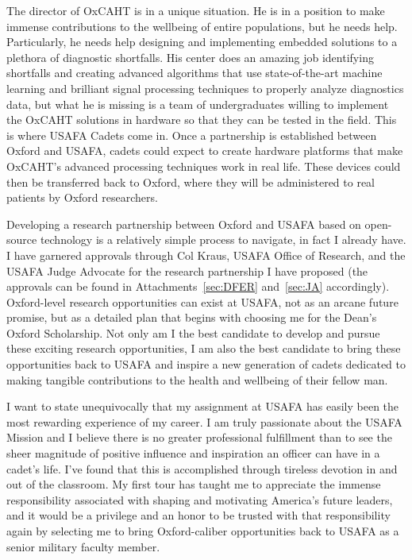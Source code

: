 \documentclass{article}
\begin{document}
The director of OxCAHT is in a unique situation. He is in a position to make
immense contributions to the wellbeing of entire populations, but he needs
help. Particularly, he needs help designing and implementing embedded solutions
to a plethora of diagnostic shortfalls. His center does an amazing job
identifying shortfalls and creating advanced algorithms that use
state-of-the-art machine learning and brilliant signal processing techniques to
properly analyze diagnostics data, but what he is missing is a team of
undergraduates willing to implement the OxCAHT solutions in hardware so that
they can be tested in the field. This is where USAFA Cadets come in. Once a
partnership is established between Oxford and USAFA, cadets could expect to
create hardware platforms that make OxCAHT's advanced processing techniques
work in real life. These devices could then be transferred back to Oxford,
where they will be administered to real patients by Oxford researchers.

Developing a research partnership between Oxford and USAFA based on open-source
technology is a relatively simple process to navigate, in fact I already have.
I have garnered approvals through Col Kraus, USAFA Office of Research, and the
USAFA Judge Advocate for the research partnership I have proposed (the
approvals can be found in Attachments~\ref{sec:DFER} and~\ref{sec:JA}
accordingly). Oxford-level research opportunities can
exist at USAFA, not as an arcane future promise, but as a detailed plan that
begins with choosing me for the Dean's Oxford Scholarship. Not only am I the
best candidate to develop and pursue these exciting research opportunities, I
am also the best candidate to bring these opportunities back to USAFA and
inspire a new generation of cadets dedicated to making tangible contributions
to the health and wellbeing of their fellow man.
 
I want to state unequivocally that my assignment at USAFA has easily been the
most rewarding experience of my career. I am truly passionate about the USAFA
Mission and I believe there is no greater professional fulfillment than to see
the sheer magnitude of positive influence and inspiration an officer can have
in a cadet's life. I've found that this is accomplished through tireless
devotion in and out of the classroom. My first tour has taught me to appreciate
the immense responsibility associated with shaping and motivating America's
future leaders, and it would be a privilege and an honor to be trusted with
that responsibility again by selecting me to bring Oxford-caliber opportunities
back to USAFA as a senior military faculty member.
 
\end{document}
